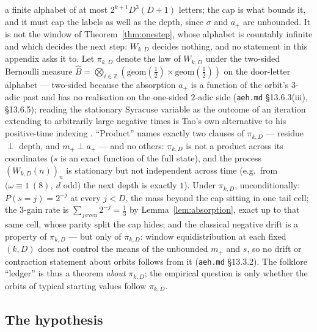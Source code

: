 \documentclass[11pt]{article}
\theoremstyle{remark}
\newcommand{\Z}{\mathbb{Z}}
\newcommand{\w}{\omega}
\begin{document}
a finite alphabet of at most $2^{k+1}D^3(D+1)$ letters; the cap is what bounds it, and it must cap the labels as well as the depth, since $\sigma$ and $a_+$ are unbounded. It is not the window of Theorem~\ref{thm:onestep}, whose alphabet is countably infinite and which decides the next step: $W_{k,D}$ decides nothing, and no statement in this appendix asks it to. Let $\pi_{k,D}$ denote the law of $W_{k,D}$ under the two-sided Bernoulli measure $\hat B = \bigotimes_{i \in \Z}(\mathrm{geom}(\tfrac12) \times \mathrm{geom}(\tfrac12))$ on the door-letter alphabet --- two-sided because the absorption $a_+$ is a function of the orbit's $3$-adic past and has no realisation on the one-sided $2$-adic side (\texttt{aeh.md} \S13.6.3(iii), \S13.6.5); reading the stationary Syracuse variable as the outcome of an iteration extending to arbitrarily large negative times is Tao's own alternative to his positive-time indexing \cite[Remark~1.13, footnote~4 of arXiv~v7]{tao}. ``Product'' names exactly two clauses of $\pi_{k,D}$ --- residue $\perp$ depth, and $m_+ \perp a_+$ --- and no others: $\pi_{k,D}$ is not a product across its coordinates ($s$ is an exact function of the full state), and the process $(W_{k,D}(n))_n$ is stationary but not independent across time (e.g.\ from $(\w \equiv 1\ (8),\ d$ odd$)$ the next depth is exactly $1$). Under $\pi_{k,D}$, unconditionally: $P(s = j) = 2^{-j}$ at every $j < D$, the mass beyond the cap sitting in one tail cell; the $3$-gain rate is $\sum_{j\,\mathrm{even}} 2^{-j} = \tfrac13$ by Lemma~\ref{lem:absorption}, exact up to that same cell, whose parity split the cap hides; and the classical negative drift is a property of $\pi_{k,D}$ --- but only of $\pi_{k,D}$: window equidistribution at each fixed $(k,D)$ does not control the means of the unbounded $m_+$ and $s$, so no drift or contraction statement about orbits follows from it (\texttt{aeh.md} \S13.3.2). The folklore ``ledger'' is thus a theorem \emph{about} $\pi_{k,D}$; the empirical question is only whether the orbits of typical starting values follow $\pi_{k,D}$.

\subsection*{The hypothesis}
\end{document}
